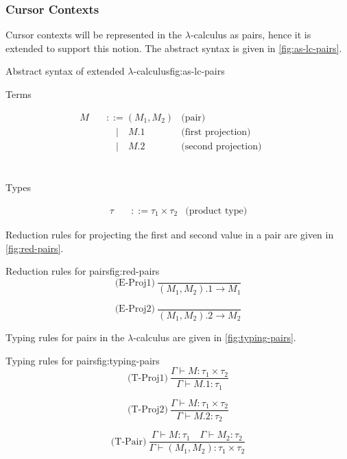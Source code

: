 \subsubsection{Cursor Contexts}
Cursor contexts will be represented in the $\lambda$-calculus as pairs, hence it is extended to support this notion. The abstract syntax is given in \cref{fig:as-lc-pairs}.

\begin{myfigure}{Abstract syntax of extended $\lambda$-calculus}{fig:as-lc-pairs}
    \begin{center}
        Terms
    \end{center}
    \[
        \begin{aligned}
            M \quad & ::= (M_1,M_2)     & \text{(pair)}              &  & \\
                    & \quad | \quad M.1 & \text{(first projection)}  &  & \\
                    & \quad | \quad M.2 & \text{(second projection)} &  & \\
        \end{aligned}
    \]
    \\
    \begin{center}
        Types
    \end{center}
    \[
        \begin{aligned}
            \tau \quad & ::= \tau_1 \times \tau_2 & \text{(product type)}
        \end{aligned}
    \]
\end{myfigure}

Reduction rules for projecting the first and second value in a pair are given in \cref{fig:red-pairs}.

\begin{myfigure}{Reduction rules for pairs}{fig:red-pairs}
    \[
        \text{(E-Proj1)} \ \frac{}{(M_1,M_2).1 \rightarrow M_1}
    \]

    \[
        \text{(E-Proj2)} \ \frac{}{(M_1,M_2).2 \rightarrow M_2}
    \]
\end{myfigure}

Typing rules for pairs in the $\lambda$-calculus are given in \cref{fig:typing-pairs}.

\begin{myfigure}{Typing rules for pairs}{fig:typing-pairs}
    \[
        \text{(T-Proj1)} \ \frac{\Gamma \vdash M : \tau_1 \times \tau_2}{\Gamma \vdash M.1 : \tau_1}
    \]

    \[
        \text{(T-Proj2)} \ \frac{\Gamma \vdash M : \tau_1 \times \tau_2}{\Gamma \vdash M.2 : \tau_2}
    \]

    \[
        \text{(T-Pair)} \ \frac{\Gamma \vdash M : \tau_1 \quad \Gamma \vdash M_2 : \tau_2}{\Gamma \vdash (M_1,M_2) : \tau_1 \times \tau_2}
    \]
\end{myfigure}


